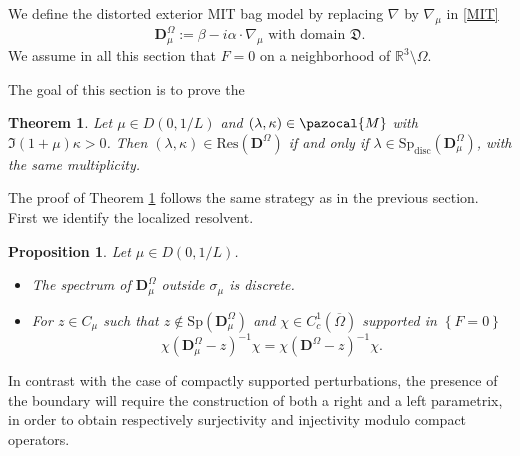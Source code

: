 \documentclass[a4paper, 12pt]{amsart}
\numberwithin{equation}{section}
\newtheorem{proposition}{Proposition}[section]
\newtheorem{theorem}{Theorem}
\newcommand{\R}{\mathbb{R}} %
\newcommand{\Sp}{\mathrm{Sp}} %
\newcommand{\disc}{\mathrm{disc}} %
\newcommand{\Res}{\mathrm{Res}} %
\newcommand{\lcb}{\left\lbrace} %
\newcommand{\rcb}{\right\rbrace} %
\newcommand{\Dvec}{\mathbf{D}}
\newcommand{\Mpaz}{\pazocal{M}}
\newcommand{\Dfrak}{\mathfrak{D}}
\begin{document}
We define the distorted exterior MIT bag model by replacing $\nabla$ by $\nabla_\mu$ in \eqref{MIT} 
\begin{equation*}\label{DistortedMIT}
    \Dvec_\mu^\Omega:=\beta-i\alpha\cdot\nabla_\mu \mbox{ with domain } \Dfrak.
\end{equation*}
We assume in all this section that $F=0$ on a neighborhood of $\R^3\setminus\Omega$.

The goal of this section is to prove the
\begin{theorem}\label{MITLinkResonanceEigenvalue}
     Let $\mu\in D(0,1/L)$ and $(\lambda,\kappa)\in\Mpaz$ with $\Im(1+\mu)\kappa>0$. Then $(\lambda,\kappa)\in\Res(\Dvec^\Omega)$ if and only if $\lambda\in\Sp_\disc(\Dvec^\Omega_\mu)$, with the same multiplicity.
\end{theorem}

The proof of Theorem \ref{MITLinkResonanceEigenvalue} follows the same strategy as in the previous section. First we identify the localized resolvent.
    
\begin{proposition}\label{MITDistortedSpectrum} 
    Let $\mu\in D(0,1/L)$.
    \begin{itemize}
        \item The spectrum of $\Dvec_\mu^\Omega$ outside $\sigma_\mu$ is discrete.
        \item For $z\in C_\mu$ such that $z\not\in\Sp(\Dvec_\mu^\Omega)$ and $\chi\in C^1_c(\overline{\Omega})$ supported in $\lcb F=0\rcb$
        \begin{equation}\label{MITCutoffDistorted}
            \chi(\Dvec_\mu^\Omega-z)^{-1}\chi=\chi(\Dvec^\Omega-z)^{-1}\chi.
        \end{equation}
    \end{itemize}
\end{proposition}

In contrast with the case of compactly supported perturbations, the presence of the boundary will require the construction of both a right and a left parametrix, in order to obtain respectively surjectivity and injectivity modulo compact operators.
\end{document}
